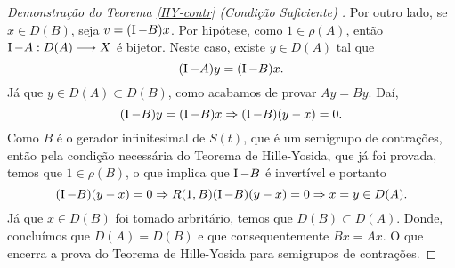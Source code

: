 \begin{proof}[Demonstração do Teorema {\ref{HY-contr}} (Condição Suficiente) ]
Por outro lado, se $x\in D(B)$, seja $v=(\operatorname{I}-B)x$. Por hipótese, como $1\in 
\rho(A)$, então $\operatorname{I}-A:D(A)\longrightarrow X$ é bijetor. Neste caso, existe 
$y\in D(A)$ tal que
\begin{equation*}
(\operatorname{I}-A)y=(\operatorname{I}-B)x.
\end{equation*}
Já que $y\in D(A)\subset D(B)$, como acabamos de provar $Ay=By$. Daí,
\begin{equation*}
(\operatorname{I}-B)y=(\operatorname{I}-B)x\Rightarrow (\operatorname{I}-B)(y-x)=0.
\end{equation*}
Como $B$ é o gerador infinitesimal de $S(t)$, que é um semigrupo de contrações, 
então pela condição necessária do Teorema de Hille-Yosida, que já foi provada, 
temos que $1\in \rho(B)$, o que implica que $\operatorname{I}-B$ é invertível e portanto
\begin{equation*}
(\operatorname{I}-B)(y-x)=0\Rightarrow R(1,B)(\operatorname{I}-B)(y-x)=0\Rightarrow x=y\in D(A).
\end{equation*}
Já que $x\in D(B)$ foi tomado arbritário, temos que $D(B)\subset D(A)$. Donde,
concluímos que $D(A)=D(B)$ e que consequentemente $Bx=Ax$. O que encerra a prova 
do Teorema de Hille-Yosida para semigrupos de contrações.





\end{proof}










